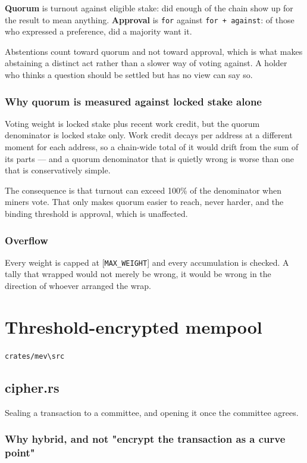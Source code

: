 \documentclass[11pt,a4paper]{article}
\begin{document}
\textbf{Quorum} is turnout against eligible stake: did enough of the chain show
up for the result to mean anything. \textbf{Approval} is \texttt{for} against
\texttt{for + against}: of those who expressed a preference, did a majority want it.

Abstentions count toward quorum and not toward approval, which is what makes
abstaining a distinct act rather than a slower way of voting against. A
holder who thinks a question should be settled but has no view can say so.

\subsubsection{Why quorum is measured against locked stake alone}

Voting weight is locked stake plus recent work credit, but the quorum
denominator is locked stake only. Work credit decays per address at a
different moment for each address, so a chain-wide total of it would drift
from the sum of its parts — and a quorum denominator that is quietly wrong
is worse than one that is conservatively simple.

The consequence is that turnout can exceed 100\% of the denominator when
miners vote. That only makes quorum easier to reach, never harder, and the
binding threshold is approval, which is unaffected.

\subsubsection{Overflow}

Every weight is capped at [\texttt{MAX\_WEIGHT}] and every accumulation is checked.
A tally that wrapped would not merely be wrong, it would be wrong in the
direction of whoever arranged the wrap.

\section{Threshold-encrypted mempool}
\noindent\texttt{crates/mev\textbackslash{}src}

\subsection{cipher.rs}
Sealing a transaction to a committee, and opening it once the committee agrees.

\subsubsection{Why hybrid, and not "encrypt the transaction as a curve point"}
\end{document}
